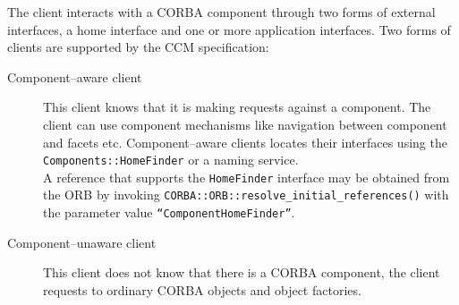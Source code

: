 The client interacts with a CORBA component through two forms of external interfaces,
a home interface and one or more application interfaces.
Two forms of clients are supported by the CCM specification:
\begin{description}
\item [Component--aware client] 
This client knows that it is making requests against a component.
The client can use component mechanisms like navigation between component and facets
etc.
Component--aware clients locates their interfaces using the {\tt Components::HomeFinder} or
a naming service.\\
A reference that supports the  {\tt HomeFinder} interface may be obtained from the 
ORB by invoking {\tt CORBA::ORB::resolve\_initial\_references()} with the
parameter value {\tt ``ComponentHomeFinder''}.


\item [Component--unaware client]
This client does not know that there is a CORBA component, the client requests
to ordinary CORBA objects and object factories. 
\end{description}



